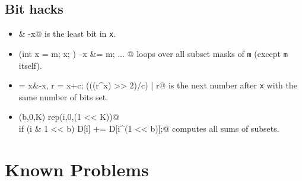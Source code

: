 	\subsection{Bit hacks}
		\begin{itemize}
			\item \verb@x & -x@ is the least bit in \texttt{x}.
			\item \verb@for (int x = m; x; ) { --x &= m; ... }@ loops over all subset masks of \texttt{m} (except \texttt{m} itself).
			\item \verb@c = x&-x, r = x+c; (((r^x) >> 2)/c) | r@ is the next number after \texttt{x} with the same number of bits set.
			\item \verb@rep(b,0,K) rep(i,0,(1 << K))@ \\ \verb@  if (i & 1 << b) D[i] += D[i^(1 << b)];@ computes all sums of subsets.
		\end{itemize}

\section{Known Problems}

